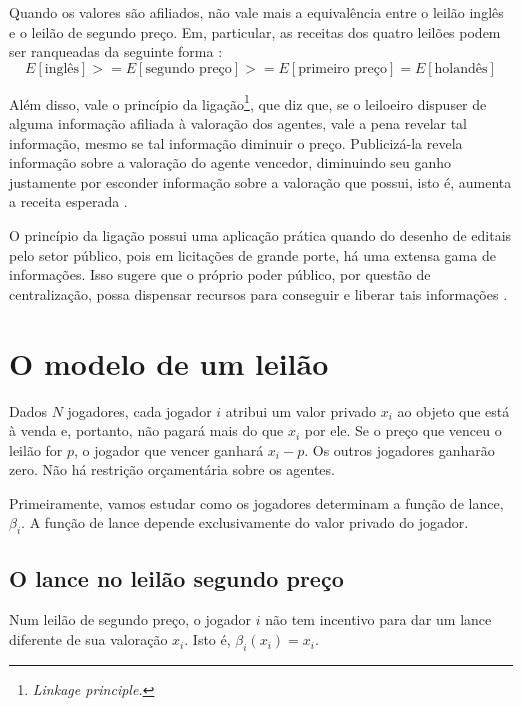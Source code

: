 Quando os valores são afiliados, não vale mais a equivalência entre o leilão inglês e o leilão de segundo preço. Em, particular, as receitas dos quatro leilões podem ser ranqueadas da seguinte forma \citet{krishna}:
\begin{equation*}
	E[\text{inglês}] >= E[\text{segundo preço}] >= E[\text{primeiro preço}] = E[\text{holandês}]
\end{equation*}

Além disso, vale o princípio da ligação\footnote{\emph{Linkage principle.}}, que diz que, se o leiloeiro dispuser de alguma informação afiliada à valoração dos agentes, vale a pena revelar tal informação, mesmo se tal informação diminuir o preço. Publicizá-la revela informação sobre a valoração do agente vencedor, diminuindo seu ganho justamente por esconder informação sobre a valoração que possui, isto é, aumenta a receita esperada \citet{Shoham2008}.

O princípio da ligação possui uma aplicação prática quando do desenho de editais pelo setor público, pois em licitações de grande porte, há uma extensa gama de informações. Isso sugere que o próprio poder público, por questão de centralização, possa dispensar recursos para conseguir e liberar tais informações \citet{pellegrini2018:MSc}.

\section{O modelo de um leilão}

Dados $N$ jogadores, cada jogador $i$ atribui um valor privado $x_i$ ao objeto que está à venda e, portanto, não pagará mais do que $x_i$ por ele. Se o preço que venceu o leilão for $p$, o jogador que vencer ganhará $x_i - p$. Os outros jogadores ganharão zero. Não há restrição orçamentária sobre os agentes.

Primeiramente, vamos estudar como os jogadores determinam a função de lance, $\beta_i$. A função de lance depende exclusivamente do valor privado do jogador.

\subsection{O lance no leilão segundo preço}

\begin{proposicao}
    \label{prop:estrategia-dominante}
    Num leilão de segundo preço, o jogador $i$ não tem incentivo para dar um lance diferente de sua valoração $x_i$. Isto é, $\beta_{i}(x_i) = x_i$.
\end{proposicao}

